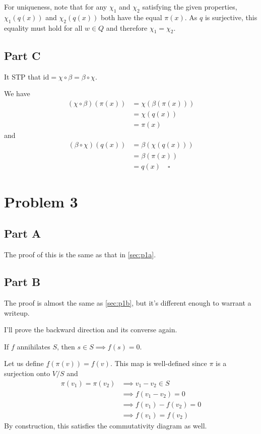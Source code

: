 \documentclass[12pt]{article}
\begin{document}
For uniqueness, note that for any $\chi_1$ and $\chi_2$ satisfying the given properties,
$\chi_1(q(x))$ and $\chi_2(q(x))$ both have the equal $\pi(x)$.
As $q$ is surjective, this equality must hold for all $w \in Q$ and therefore $\chi_1=\chi_2$.

\subsection{Part C}

It STP that $\text{id}=\chi \circ \beta=\beta \circ \chi$.

We have
\begin{align*}
  (\chi \circ \beta)(\pi(x))
   & = \chi(\beta(\pi(x))) \\
   & = \chi(q(x))          \\
   & = \pi(x)
\end{align*}
and
\begin{align*}
  (\beta \circ \chi)(q(x))
   & = \beta(\chi(q(x))) \\
   & = \beta(\pi(x))     \\
   & = q(x)\quad\square
\end{align*}

\pagebreak

\section{Problem 3}

\subsection{Part A}

The proof of this is the same as that in \ref{sec:p1a}.

\subsection{Part B}

The proof is almost the same as \ref{sec:p1b}, but it's different enough to warrant a writeup.

I'll prove the backward direction and its converse again.

If $f$ annihilates $S$, then $s \in S \implies f(s)=0$.

Let us define $\underline{f}(\pi(v))=f(v)$.
This map is well-defined since $\pi$ is a surjection onto $V/S$ and
\begin{align*}
  \pi(v_1)=\pi(v_2)
   & \implies v_1-v_2 \in S   \\
   & \implies f(v_1-v_2)=0    \\
   & \implies f(v_1)-f(v_2)=0 \\
   & \implies f(v_1)=f(v_2)
\end{align*}
By construction, this satisfies the commutativity diagram as well.
\end{document}
